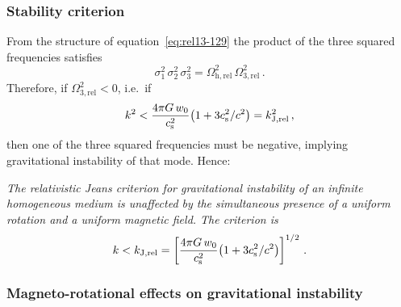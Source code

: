 \subsubsection*{Stability criterion}

From the structure of equation~\eqref{eq:rel13-129} the product of the
three squared frequencies satisfies
\begin{equation}
  \sigma_{1}^{2}\,\sigma_{2}^{2}\,\sigma_{3}^{2}
  = \Omega_{\mathrm{h,rel}}^{2}\,\Omega_{\mathrm{3,rel}}^{2}\,.
  \label{eq:rel13-132}
\end{equation}
Therefore, if $\Omega_{\mathrm{3,rel}}^{2} < 0$, i.e.\ if
\begin{equation}
  k^{2}
  < \frac{4\pi G\,w_{0}}{c_{\mathrm{s}}^{2}}
    \bigl(1 + 3c_{\mathrm{s}}^{2}/c^{2}\bigr)
  = k_{\mathrm{J,rel}}^{2}\,,
  \label{eq:rel13-instab}
\end{equation}
then one of the three squared frequencies must be negative,
implying gravitational instability of that mode.  Hence:

\medskip
\noindent\textit{The relativistic Jeans criterion for gravitational
instability of an infinite homogeneous medium is unaffected by the
simultaneous presence of a uniform rotation and a uniform magnetic
field.  The criterion is}
\begin{equation}
  k < k_{\mathrm{J,rel}}
  = \left[\frac{4\pi G\,w_{0}}{c_{\mathrm{s}}^{2}}
    \bigl(1 + 3c_{\mathrm{s}}^{2}/c^{2}\bigr)\right]^{1/2}\,.
  \label{eq:rel13-kJfinal}
\end{equation}

\subsubsection*{Magneto-rotational effects on gravitational instability}

